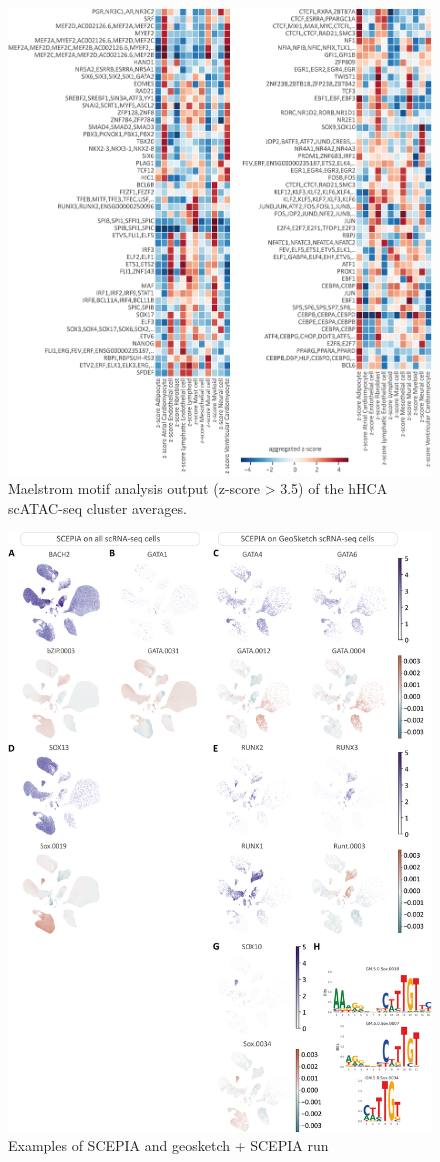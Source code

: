 \begin{figure}
    \centering
    \includegraphics[width=\linewidth]{ch.scepia/imgs/Maelstrom_AllHitsAbove3.5.png}
    \caption{Maelstrom motif analysis output (z-score > 3.5) of the hHCA scATAC-seq cluster averages.}
    \label{fig:scepia_maelstromhm}
\end{figure}

\begin{figure}
    \centering
    \includegraphics[height=1\linewidth]{ch.scepia/imgs/SCEPIA_SCEPIAGEO_BiologicalExamples_SuppFig1_v6.png}
    \caption{Examples of SCEPIA and geosketch + SCEPIA run}
    \label{fig:scepia_features1}
\end{figure}

